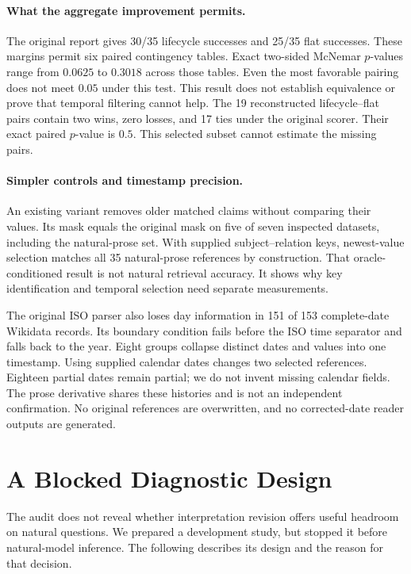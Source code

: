\documentclass[11pt]{article}
\begin{document}
\paragraph{What the aggregate improvement permits.}
The original report gives 30/35 lifecycle successes and 25/35 flat successes.
These margins permit six paired contingency tables.
Exact two-sided McNemar $p$-values range from $0.0625$ to $0.3018$ across those tables.
Even the most favorable pairing does not meet $0.05$ under this test.
This result does not establish equivalence or prove that temporal filtering cannot help.
The 19 reconstructed lifecycle--flat pairs contain two wins, zero losses, and 17 ties under the original scorer.
Their exact paired $p$-value is $0.5$.
This selected subset cannot estimate the missing pairs.

\paragraph{Simpler controls and timestamp precision.}
An existing variant removes older matched claims without comparing their values.
Its mask equals the original mask on five of seven inspected datasets, including the natural-prose set.
With supplied subject--relation keys, newest-value selection matches all 35 natural-prose references by construction.
That oracle-conditioned result is not natural retrieval accuracy.
It shows why key identification and temporal selection need separate measurements.

The original ISO parser also loses day information in 151 of 153 complete-date Wikidata records.
Its boundary condition fails before the ISO time separator and falls back to the year.
Eight groups collapse distinct dates and values into one timestamp.
Using supplied calendar dates changes two selected references.
Eighteen partial dates remain partial; we do not invent missing calendar fields.
The prose derivative shares these histories and is not an independent confirmation.
No original references are overwritten, and no corrected-date reader outputs are generated.

\section{A Blocked Diagnostic Design}
\label{sec:diagnostic}

The audit does not reveal whether interpretation revision offers useful headroom on natural questions.
We prepared a development study, but stopped it before natural-model inference.
The following describes its design and the reason for that decision.
\end{document}
